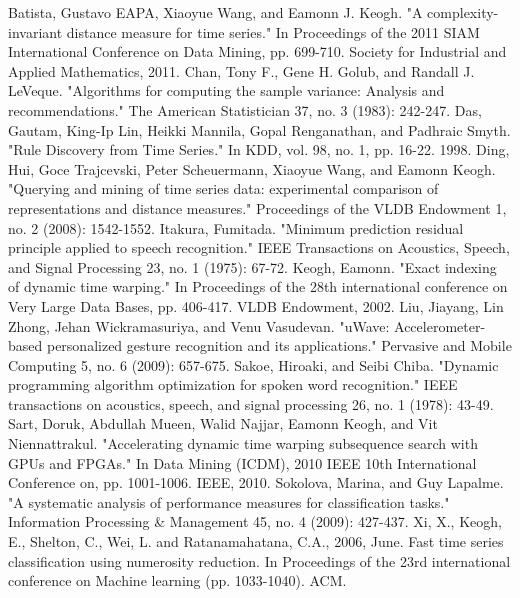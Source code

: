 \begin{thebibliography}{1} 
    \normalsize
     Batista, Gustavo EAPA, Xiaoyue Wang, and Eamonn J. Keogh. "A complexity-invariant
        distance measure for time series." In Proceedings of the 2011 SIAM International Conference on Data Mining, pp.
        699-710. Society for Industrial and Applied Mathematics, 2011.
     Chan, Tony F., Gene H. Golub, and Randall J. LeVeque. "Algorithms for computing the
        sample variance: Analysis and recommendations." The American Statistician 37, no. 3 (1983): 242-247.
     Das, Gautam, King-Ip Lin, Heikki Mannila, Gopal Renganathan, and Padhraic Smyth. "Rule
        Discovery from Time Series." In KDD, vol. 98, no. 1, pp. 16-22. 1998.
     Ding, Hui, Goce Trajcevski, Peter Scheuermann, Xiaoyue Wang, and Eamonn Keogh. "Querying
        and mining of time series data: experimental comparison of representations and distance measures." Proceedings
        of the VLDB Endowment 1, no. 2 (2008): 1542-1552.
     Itakura, Fumitada. "Minimum prediction residual principle applied to speech
        recognition." IEEE Transactions on Acoustics, Speech, and Signal Processing 23, no. 1 (1975): 67-72.
     Keogh, Eamonn. "Exact indexing of dynamic time warping." In Proceedings of the 28th
        international conference on Very Large Data Bases, pp. 406-417. VLDB Endowment, 2002.
     Liu, Jiayang, Lin Zhong, Jehan Wickramasuriya, and Venu Vasudevan. "uWave:
        Accelerometer-based personalized gesture recognition and its applications." Pervasive and Mobile Computing 5,
        no. 6 (2009): 657-675.
     Sakoe, Hiroaki, and Seibi Chiba. "Dynamic programming algorithm optimization for spoken
        word recognition." IEEE transactions on acoustics, speech, and signal processing 26, no. 1 (1978): 43-49.
     Sart, Doruk, Abdullah Mueen, Walid Najjar, Eamonn Keogh, and Vit Niennattrakul.
        "Accelerating dynamic time warping subsequence search with GPUs and FPGAs." In Data Mining (ICDM), 2010 IEEE
        10th International Conference on, pp. 1001-1006. IEEE, 2010.
     Sokolova, Marina, and Guy Lapalme. "A systematic analysis of performance measures
        for classification tasks." Information Processing \& Management 45, no. 4 (2009): 427-437.
     Xi, X., Keogh, E., Shelton, C., Wei, L. and Ratanamahatana, C.A., 2006, June. Fast time series
        classification using numerosity reduction. In Proceedings of the 23rd international conference on Machine
        learning (pp. 1033-1040). ACM.
\end{thebibliography}
